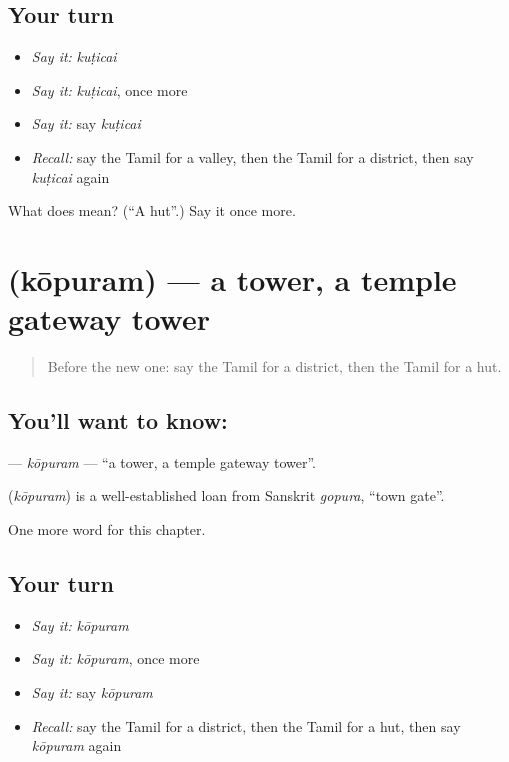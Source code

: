 \subsection*{Your turn}
\begin{itemize}
\raggedright
  \item \emph{Say it:} \emph{kuṭicai}
  \item \emph{Say it:} \emph{kuṭicai}, once more
  \item \emph{Say it:} say \emph{kuṭicai}
  \item \emph{Recall:} say the Tamil for a valley, then the Tamil for a district, then say \emph{kuṭicai} again
\end{itemize}

\begin{tcolorbox}[breakable,colback=teal!4,colframe=teal!35!black,title={Before you move on}]
What does  mean? (\textquotedblleft{}A hut\textquotedblright{}.) Say it once more.
\end{tcolorbox}
\section[\texorpdfstring{\ta{கோபுரம்} (kōpuram)}{கோபுரம் (kōpuram)}]{ (kōpuram) — a tower, a temple gateway tower}

\label{lesson:TA-C265-kopuram}



\begin{quote}
Before the new one: say the Tamil for a district, then the Tamil for a hut.
\end{quote}

\subsection*{You'll want to know: }
\textbf{} — \emph{kōpuram} — \textquotedblleft{}a tower, a temple gateway tower\textquotedblright{}.

\begin{cousinweb}
\textbf{} (\emph{kōpuram}) is a well-established loan from Sanskrit \emph{gopura}, \textquotedblleft{}town gate\textquotedblright{}.
\end{cousinweb}

\begin{grammarlens}[title={What you've built}]
One more word for this chapter.
\end{grammarlens}

\subsection*{Your turn}
\begin{itemize}
\raggedright
  \item \emph{Say it:} \emph{kōpuram}
  \item \emph{Say it:} \emph{kōpuram}, once more
  \item \emph{Say it:} say \emph{kōpuram}
  \item \emph{Recall:} say the Tamil for a district, then the Tamil for a hut, then say \emph{kōpuram} again
\end{itemize}

